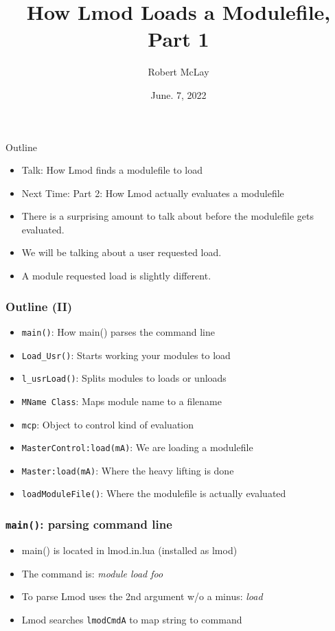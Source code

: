\documentclass{beamer}
\begin{document}
\title[Lmod]{How Lmod Loads a Modulefile, Part 1}
\author{Robert McLay} 
\date{June. 7, 2022}

\frame{\titlepage} 


\begin{frame}{Outline}
  \begin{itemize}
    \item Talk: How Lmod finds a modulefile to load
    \item Next Time: Part 2: How Lmod actually evaluates a modulefile
    \item There is a surprising amount to talk about before the
      modulefile gets evaluated.
    \item We will be talking about a user requested load.
    \item A module requested load is slightly different. 
  \end{itemize}
\end{frame}

\begin{frame}[fragile]
    \frametitle{Outline (II)}
  \begin{itemize}
    \item \texttt{main()}: How main() parses the command line
    \item \texttt{Load\_Usr()}: Starts working your modules to load
    \item \texttt{l\_usrLoad()}: Splits modules to loads or unloads
    \item \texttt{MName Class}: Maps module name to a filename
    \item \texttt{mcp}: Object to control kind of evaluation
    \item \texttt{MasterControl:load(mA)}: We are loading a modulefile
    \item \texttt{Master:load(mA)}: Where the heavy lifting is done
    \item \texttt{loadModuleFile()}: Where the modulefile is actually evaluated
  \end{itemize}
\end{frame}

\begin{frame}[fragile]
    \frametitle{\texttt{main()}: parsing command line}
  \begin{itemize}
    \item main() is located in lmod.in.lua (installed as lmod)
    \item The command is: {\color{blue}\emph{module load foo}}
    \item To parse Lmod uses the 2nd argument w/o a minus: {\color{blue}\emph{load}}
    \item Lmod searches \texttt{lmodCmdA} to map string to command
  \end{itemize}
\end{frame}
\end{document}

